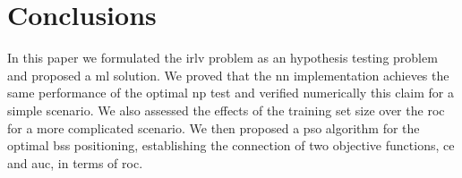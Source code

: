 \documentclass[conference,draftcls,onecolumn]{IEEEtran}
\begin{document}
 
\section{Conclusions}
\label{sec:conc}

In this paper we formulated the \ac{irlv} problem as an hypothesis testing problem and proposed a \ac{ml} solution. We proved that the \ac{nn} implementation achieves the same performance of the optimal \ac{np} test and verified numerically this claim for a simple scenario. We also assessed the effects of the training set size over the \ac{roc} for a more complicated scenario. We then proposed a \ac{pso}  algorithm for the  optimal \acp{bs} positioning, establishing the connection of two objective functions, \ac{ce} and \ac{auc}, in terms of  \ac{roc}.


\renewcommand*{\bibfont}{\footnotesize}

\printbibliography
\end{document}
